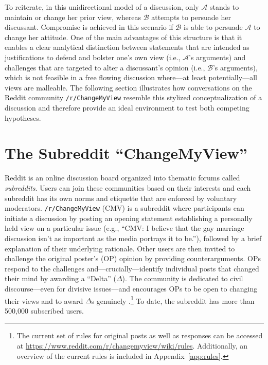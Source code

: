 To reiterate, in this unidirectional model of a discussion, only $\mathcal{A}$ stands to maintain or change her prior view, whereas $\mathcal{B}$ attempts to persuade her discussant. Compromise is achieved in this scenario if $\mathcal{B}$ is able to persuade $\mathcal{A}$ to change her attitude. One of the main advantages of this structure is that it enables a clear analytical distinction between statements that are intended as justifications to defend and bolster one's own view (i.e., $\mathcal{A}$'s arguments) and challenges that are targeted to alter a discussant's opinion (i.e., $\mathcal{B}$'s arguments), which is not feasible in a free flowing discussion where---at least potentially---all views are malleable. The following section illustrates how conversations on the Reddit community \texttt{/r/ChangeMyView} resemble this stylized conceptualization of a discussion and therefore provide an ideal environment to test both competing hypotheses.



\section{The Subreddit ``ChangeMyView''}

Reddit is an online discussion board organized into thematic forums called \textit{subreddits}. Users can join these communities based on their interests and each subreddit has its own norms and etiquette that are enforced by voluntary moderators. \texttt{/r/ChangeMyView} (CMV) is a subreddit where participants can initiate a discussion by posting an opening statement establishing a personally held view on a particular issue (e.g., ``CMV: I believe that the gay marriage discussion isn't as important as the media portrays it to be.''), followed by a brief explanation of their underlying rationale. Other users are then invited to challenge the original poster's (OP) opinion by providing counterarguments. OPs respond to the challenges and---crucially---identify individual posts that changed their mind by awarding a ``Delta'' ($\Delta$). The community is dedicated to civil discourse---even for divisive issues---and encourages OPs to be open to changing their views and to award $\Delta$s genuinely \citep[see also][]{jhaver2017designing}.\footnote{The current set of rules for original posts as well as responses can be accessed at \url{https://www.reddit.com/r/changemyview/wiki/rules}. Additionally, an overview of the current rules is included in Appendix~\ref{app:rules}.} To date, the subreddit has more than 500,000 subscribed users.

